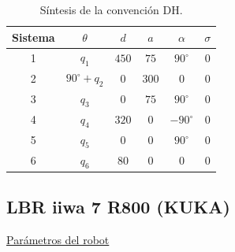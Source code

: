 \documentclass[a4paper,12pt]{article}
\begin{document}
\begin{table}[H]
    \centering
    \begin{tabular}{|c|c|c|c|c|c|}
    \hline
    Sistema & $\theta$          & $d$    & $a$   & $\alpha$    & $\sigma$ \\ \hline
    1       & $q_1$             & $450$  & $75$  & $90^\circ$  & 0        \\ \hline
    2       & $90^\circ + q_2$  & $0$    & $300$ & $0$         & 0        \\ \hline
    3       & $q_3$             & $0$    & $75$  & $90^\circ$  & 0        \\ \hline
    4       & $q_4$             & $320$  & $0$   & $-90^\circ$ & 0        \\ \hline
    5       & $q_5$             & $0$    & $0$   & $90^\circ$  & 0        \\ \hline
    6       & $q_6$             & $80$   & $0$   & $0$         & 0        \\ \hline
    \end{tabular}
    \caption{Síntesis de la convención DH.}
    \label{sintesis DH FANUC}
\end{table}

\newpage
\subsection{LBR iiwa 7 R800 (KUKA)}
\label{subsec: robot 6}

\href{https://www.kuka.com/-/media/kuka-downloads/imported/8350ff3ca11642998dbdc81dcc2ed44c/0000246832_es.pdf?rev=b8bb2cd18a86416c98d05eb8edb9c187&hash=9C76A209C7EE46596A933A841554D4CD}{Parámetros del robot}
\end{document}
